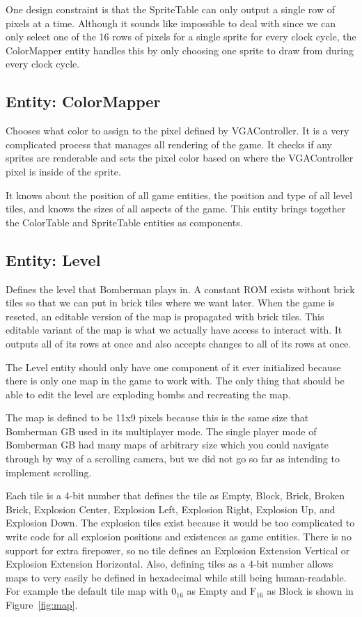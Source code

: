 \documentclass[10pt,a4paper]{article}
\begin{document}
One design constraint is that the SpriteTable can only output a single row of pixels at a time. Although it sounds like impossible to deal with since we can only select one of the 16 rows of pixels for a single sprite for every clock cycle, the ColorMapper entity handles this by only choosing one sprite to draw from during every clock cycle.

\subsection{Entity: ColorMapper}
Chooses what color to assign to the pixel defined by VGAController. It is a very complicated process that manages all rendering of the game. It checks if any sprites are renderable and sets the pixel color based on where the VGAController pixel is inside of the sprite.

It knows about the position of all game entities, the position and type of all level tiles, and knows the sizes of all aspects of the game. This entity brings together the ColorTable and SpriteTable entities as components.

\subsection{Entity: Level}
Defines the level that Bomberman plays in. A constant ROM exists without brick tiles so that we can put in brick tiles where we want later. When the game is reseted, an editable version of the map is propagated with brick tiles. This editable variant of the map is what we actually have access to interact with. It outputs all of its rows at once and also accepts changes to all of its rows at once.

The Level entity should only have one component of it ever initialized because there is only one map in the game to work with. The only thing that should be able to edit the level are exploding bombs and recreating the map.

The map is defined to be 11x9 pixels because this is the same size that Bomberman GB used in its multiplayer mode. The single player mode of Bomberman GB had many maps of arbitrary size which you could navigate through by way of a scrolling camera, but we did not go so far as intending to implement scrolling.

Each tile is a 4-bit number that defines the tile as Empty, Block, Brick, Broken Brick, Explosion Center, Explosion Left, Explosion Right, Explosion Up, and Explosion Down. The explosion tiles exist because it would be too complicated to write code for all explosion positions and existences as game entities. There is no support for extra firepower, so no tile defines an Explosion Extension Vertical or Explosion Extension Horizontal. Also, defining tiles as a 4-bit number allows maps to very easily be defined in hexadecimal while still being human-readable. For example the default tile map with $ 0_{16} $ as Empty and $ \mbox{F}_{16} $ as Block is shown in Figure~\ref{fig:map}.
\end{document}
